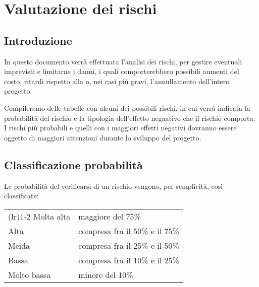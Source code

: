 \chapter{Valutazione dei rischi} 

\section{Introduzione}
In questo documento verrà effettuata l'analisi dei rischi, per gestire eventuali imprevisti e limitarne i danni, i quali comporterebbero possibili aumenti del costo, ritardi rispetto alla  o, nei casi più gravi, l'annullamento dell'intero progetto.

Compileremo delle tabelle con alcuni dei possibili rischi, in cui verrà indicata la probabilità del rischio e la tipologia dell'effetto negaativo che il rischio comporta. I rischi più probabili e quelli con i maggiori effetti negativi dovranno essere oggetto di maggiori attenzioni durante lo sviluppo del progetto.

\section{Classificazione probabilità}
Le probabilità del verificarsi di un rischio vengono, per semplicità, così classificate:
\begin{center}
	\begin{tabularx}{\tabwidthiter}{ l  X } 
		\toprule
			\fromattaTitoloTab{Classificazione} & \fromattaTitoloTab{Probabilità} \\
		\cmidrule(l{\cmidrulekern}r{\cmidrulekern}){1-2}
			Molta alta & maggiore del 75\% \\ 
			\addlinespace[1em] 
			Alta & compresa fra il 50\% e il 75\%  \\ 
			\addlinespace[1em] 
			Meida & compresa fra il 25\% e il 50\%  \\ 
			\addlinespace[1em] 
			Bassa & compresa fra il 10\% e il 25\%  \\ 
			\addlinespace[1em] 
			Molto bassa & minore del 10\% \\ 
		\bottomrule
	\end{tabularx}
\end{center}

